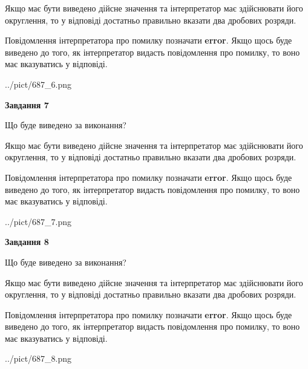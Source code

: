 \documentclass[12pt, ukrainian]{article}
\begin{document}
{\begin {Large}
Якщо має бути виведено дійсне значення та інтерпретатор має здійснювати його округлення, 
то у відповіді достатньо правильно вказати два дробових розряди.

Повідомлення інтерпретатора про помилку позначати \textbf{error}.
Якщо щось буде виведено до того, як інтерпретатор видасть повідомлення про помилку, 
то воно має вказуватись у відповіді. \par

\begin{center}
	{../pict/687_6.png}
\end{center}
\newpage

{\begin {center}\textbf{Завдання 7}\end {center}}\par
Що буде виведено за виконання? \par

Якщо має бути виведено дійсне значення та інтерпретатор має здійснювати його округлення, 
то у відповіді достатньо правильно вказати два дробових розряди.

Повідомлення інтерпретатора про помилку позначати \textbf{error}.
Якщо щось буде виведено до того, як інтерпретатор видасть повідомлення про помилку, 
то воно має вказуватись у відповіді. \par

\begin{center}
	{../pict/687_7.png}
\end{center}
\newpage

{\begin {center}\textbf{Завдання 8}\end {center}}\par
Що буде виведено за виконання? \par

Якщо має бути виведено дійсне значення та інтерпретатор має здійснювати його округлення, 
то у відповіді достатньо правильно вказати два дробових розряди.

Повідомлення інтерпретатора про помилку позначати \textbf{error}.
Якщо щось буде виведено до того, як інтерпретатор видасть повідомлення про помилку, 
то воно має вказуватись у відповіді. \par

\begin{center}
	{../pict/687_8.png}
\end{center}
\newpage


\end{Large}}
\end{document}
